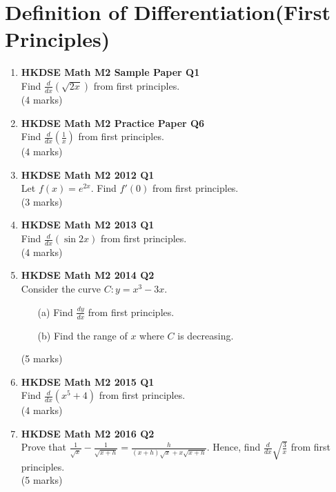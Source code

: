 \documentclass{report}
\begin{document}
\chapter{Definition of Differentiation(First Principles)}
\begin{enumerate}
	\item \textbf{HKDSE Math M2 Sample Paper Q1}\\
	Find $\displaystyle\frac{d}{dx}(\sqrt{2x})$ from first principles. \\(4 marks)

	\item \textbf{HKDSE Math M2 Practice Paper Q6}\\
	Find $\displaystyle\frac{d}{dx}\left(\frac{1}{x}\right)$ from first principles. \\(4 marks)	

	\item \textbf{HKDSE Math M2 2012 Q1}\\
	Let $f(x) = e^{2x}$. Find $f'(0)$ from first principles. \\(3 marks)	

	\item \textbf{HKDSE Math M2 2013 Q1}\\
	Find $\displaystyle\frac{d}{dx} (\sin{2x})$ from first principles. \\(4 marks)	

	\item \textbf{HKDSE Math M2 2014 Q2}\\
	Consider the curve $C : y = x^3-3x$. 
	\begin{enumerate}
		\item [(a)]Find $\displaystyle\frac{dy}{dx}$ from  first principles. 
		\item [(b)]Find the range of $x$ where $C$ is decreasing.
	\end{enumerate}
	(5 marks)

	\item \textbf{HKDSE Math M2 2015 Q1}\\
	Find $\displaystyle \frac{d}{dx} (x^5+4)$ from first principles. \\(4 marks)

	\item \textbf{HKDSE Math M2 2016 Q2}\\
	Prove that $\displaystyle\frac{1}{\sqrt{x}} - \frac{1}{\sqrt{x+h}} = \frac{h}{(x+h)\sqrt{x} + x\sqrt{x+h}}$. Hence, find $\displaystyle \frac{d}{dx} \sqrt{\displaystyle\frac{3}{x}}$ from first principles. \\(5 marks)


\end{enumerate}
\end{document}
